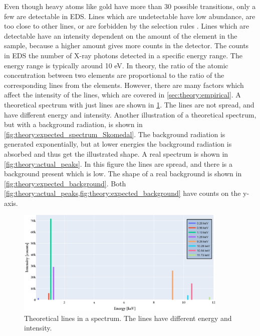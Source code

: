 Even though heavy atoms like gold have more than 30 possible transitions, only a few are detectable in EDS.
Lines which are undetectable have low abundance, are too close to other lines, or are forbidden by the selection rules \cite[Ch. 4.2.3]{goldstein_scanning_2018}.
Lines which are detectable have an intensity dependent on the amount of the element in the sample, because a higher amount gives more counts in the detector.
The counts in EDS the number of X-ray photons detected in a specific energy range.
The energy range is typically around 10 eV.
In theory, the ratio of the atomic concentration between two elements are proportional to the ratio of the corresponding lines from the elements.
However, there are many factors which affect the intensity of the lines, which are covered in \cref{sec:theory:empirical}.
A theoretical spectrum with just lines are shown in \cref{fig:theory:expected_lines}.
The lines are not spread, and have different energy and intensity.
Another illustration of a theoretical spectrum, but with a background radiation, is shown in \cref{fig:theory:expected_spectrum_Skomedal}.
The background radiation is generated exponentially, but at lower energies the background radiation is absorbed and thus get the illustrated shape.
A real spectrum is shown in \cref{fig:theory:actual_peaks}.
In this figure the lines are spread, and there is a background present which is low.
The shape of a real background is shown in \cref{fig:theory:expected_background}.
Both \cref{fig:theory:actual_peaks,fig:theory:expected_background} have counts on the y-axis.


\begin{figure}[p]
    \centering
    \includegraphics[width=0.9\textwidth]{figures/expected_lines.png}
    \caption{
        Theoretical lines in a spectrum.
        The lines have different energy and intensity.
    }
    \label{fig:theory:expected_lines}
\end{figure}

